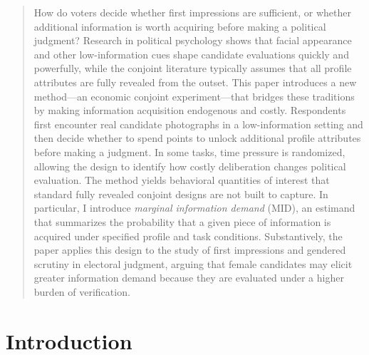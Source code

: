 \documentclass[11pt]{article}
\author[1,2]{\textsc{Hector Bahamonde}}
\affil[ ]{\small
  \,|\, \href{mailto:hector.bahamonde@utu.fi}{hector.bahamonde@utu.fi} \,|\, 
 \vspace{1cm}
}
\affil[1]{Senior Researcher, University of Turku, Finland}
\affil[2]{Project Researcher, Social Science Research Institute, \AA bo Akademi University, Finland}
\date{\today}
\begin{document}
\maketitle
\thispagestyle{empty}

\begin{abstract}
How do voters decide whether first impressions are sufficient, or whether additional information is worth acquiring before making a political judgment? Research in political psychology shows that facial appearance and other low-information cues shape candidate evaluations quickly and powerfully, while the conjoint literature typically assumes that all profile attributes are fully revealed from the outset. This paper introduces a new method---an economic conjoint experiment---that bridges these traditions by making information acquisition endogenous and costly. Respondents first encounter real candidate photographs in a low-information setting and then decide whether to spend points to unlock additional profile attributes before making a judgment. In some tasks, time pressure is randomized, allowing the design to identify how costly deliberation changes political evaluation. The method yields behavioral quantities of interest that standard fully revealed conjoint designs are not built to capture. In particular, I introduce \emph{marginal information demand} (MID), an estimand that summarizes the probability that a given piece of information is acquired under specified profile and task conditions. Substantively, the paper applies this design to the study of first impressions and gendered scrutiny in electoral judgment, arguing that female candidates may elicit greater information demand because they are evaluated under a higher burden of verification.
\end{abstract}

\clearpage
{}
\setcounter{page}{1}

\section*{Introduction}
\end{document}

